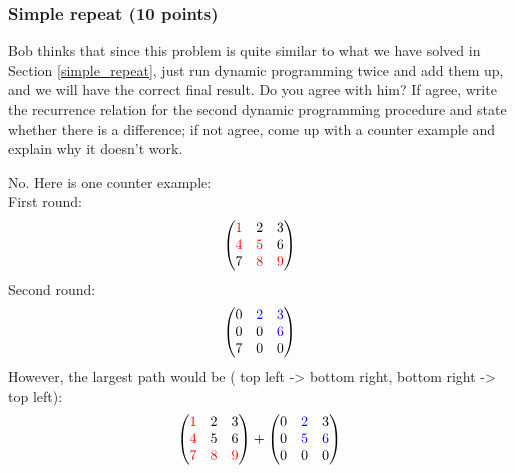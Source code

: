 \documentclass[11pt]{exam}
\begin{document}
\subsubsection{Simple repeat (10 points)}
Bob thinks that since this problem is quite similar to what we 
have solved in Section \ref{simple_repeat}, just run dynamic programming twice and add them up, and we will have the correct final result. Do you agree with him? If agree, write the recurrence relation for the second dynamic programming procedure and state whether there is a difference; if not agree, come up with a counter example and explain why it doesn't work.
\begin{solution}
No. Here is one counter example:\\
First round: 
\begin{equation*}
    \begin{pmatrix}
        \textcolor{red}{1} & 2 & 3\\
        \textcolor{red}{4} & \textcolor{red}{5} & 6\\
        7 & \textcolor{red}{8} & \textcolor{red}{9}
    \end{pmatrix}
\end{equation*}
Second round:
\begin{equation*}
    \begin{pmatrix}
        0 & \textcolor{blue}{2} & \textcolor{blue}{3}\\
        0 & 0 & \textcolor{blue}{6}\\
        7 & 0 & 0
    \end{pmatrix}
\end{equation*}
However, the largest path would be ({\color{red} top left -> bottom right}, {\color{blue} bottom right -> top left}):
\begin{equation*}
    \begin{pmatrix}
        \textcolor{red}{1} & {2} & {3}\\
        \textcolor{red}{4} & 5 & {6}\\
        \textcolor{red}{7} & \textcolor{red}{8} & \textcolor{red}{9}
    \end{pmatrix}
    + 
    \begin{pmatrix}
        0 & \textcolor{blue}{2} & 3\\
        0 & \textcolor{blue}{5} & \textcolor{blue}{6} \\
        0 & 0 & 0
    \end{pmatrix}
\end{equation*}
\end{solution}
\end{document}
